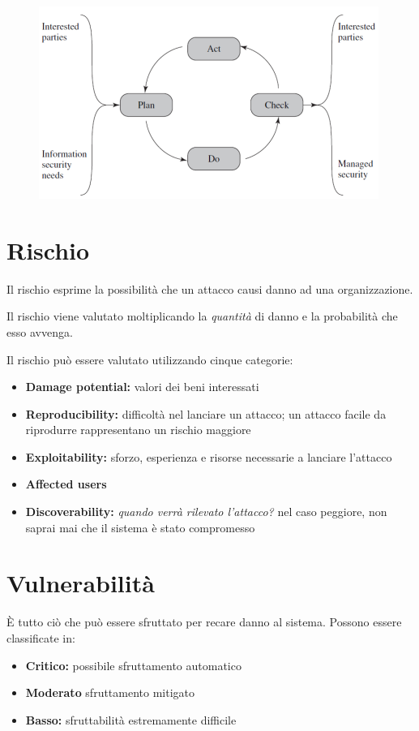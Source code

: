 \begin{figure}[ht]
    \centering
    \includegraphics[width=0.75\linewidth]{chapters/images3/plandocheckact.png}
\end{figure}

\section{Rischio}

Il rischio esprime la possibilità che un attacco causi danno ad una organizzazione.

Il rischio viene valutato moltiplicando la \textit{quantità} di danno 
e la probabilità che esso avvenga.

Il rischio può essere valutato utilizzando cinque categorie:
\begin{itemize}
    \item \textbf{Damage potential:} valori dei beni interessati
    \item \textbf{Reproducibility:} difficoltà nel lanciare un attacco; un attacco facile da riprodurre rappresentano un rischio maggiore
    \item \textbf{Exploitability:} sforzo, esperienza e risorse necessarie a lanciare l'attacco
    \item \textbf{Affected users}
    \item \textbf{Discoverability:} \textit{quando verrà rilevato l'attacco?} nel caso peggiore, non saprai mai che il sistema è stato compromesso 
\end{itemize}

\section{Vulnerabilità}
È tutto ciò che può essere sfruttato per recare danno al sistema. Possono
essere classificate in:
\begin{itemize}
    \item \textbf{Critico:} possibile sfruttamento automatico
    \item \textbf{Moderato} sfruttamento mitigato 
    \item \textbf{Basso:} sfruttabilità estremamente difficile
\end{itemize}

